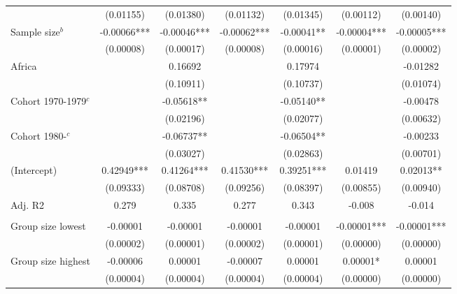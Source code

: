 \begin{tabular}[t]{lcccccc}
\hspace{1em} & (0.01155) & (0.01380) & (0.01132) & (0.01345) & (0.00112) & (0.00140)\\
\hspace{1em}Sample size$^b$ & -0.00066*** & -0.00046*** & -0.00062*** & -0.00041** & -0.00004*** & -0.00005***\\
\hspace{1em} & (0.00008) & (0.00017) & (0.00008) & (0.00016) & (0.00001) & (0.00002)\\
\hspace{1em}Africa &  & 0.16692 &  & 0.17974 &  & -0.01282\\
\hspace{1em} &  & (0.10911) &  & (0.10737) &  & (0.01074)\\
\hspace{1em}Cohort 1970-1979$^c$ &  & -0.05618** &  & -0.05140** &  & -0.00478\\
\hspace{1em} &  & (0.02196) &  & (0.02077) &  & (0.00632)\\
\hspace{1em}Cohort 1980-$^c$ &  & -0.06737** &  & -0.06504** &  & -0.00233\\
\hspace{1em} &  & (0.03027) &  & (0.02863) &  & (0.00701)\\
\hspace{1em}(Intercept) & 0.42949*** & 0.41264*** & 0.41530*** & 0.39251*** & 0.01419 & 0.02013**\\
\hspace{1em} & (0.09333) & (0.08708) & (0.09256) & (0.08397) & (0.00855) & (0.00940)\\
\hspace{1em}Adj. R2 & 0.279 & 0.335 & 0.277 & 0.343 & -0.008 & -0.014\\
\addlinespace[0.5em]
\multicolumn{7}{l}{\textit{Panel C: Group Size}}\\
\midrule \hspace{1em}Group size lowest & -0.00001 & -0.00001 & -0.00001 & -0.00001 & -0.00001*** & -0.00001***\\
\hspace{1em} & (0.00002) & (0.00001) & (0.00002) & (0.00001) & (0.00000) & (0.00000)\\
\hspace{1em}Group size highest & -0.00006 & 0.00001 & -0.00007 & 0.00001 & 0.00001* & 0.00001\\
\hspace{1em} & (0.00004) & (0.00004) & (0.00004) & (0.00004) & (0.00000) & (0.00000)\\

\end{tabular}
